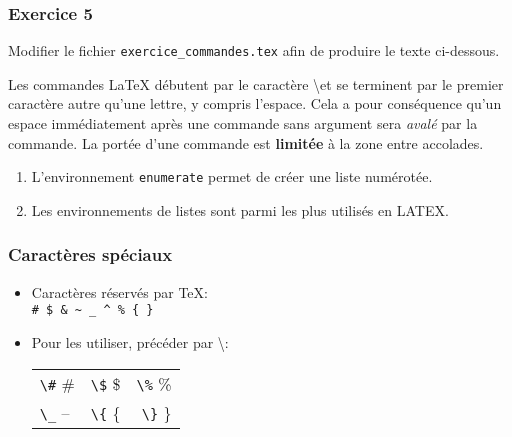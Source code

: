 
\begin{frame}

	\frametitle{Exercice 5}
	
	Modifier le fichier \texttt{exercice\_commandes.tex} afin de produire le
	texte ci-dessous.
	
	{\rmfamily Les commandes {\LaTeX} débutent par le caractère \textbackslash et se terminent par le
		premier caractère autre qu’une lettre, y compris l’espace. Cela a pour conséquence
		qu’un espace immédiatement après une commande sans argument	sera \emph{avalé} par la commande.
		La portée d’une commande est \textbf{limitée} à la zone entre accolades.
		
		\begin{enumerate}
			\item L’environnement \texttt{enumerate} permet de créer une liste numérotée.
			\item Les environnements de listes sont parmi les plus utilisés en LATEX.
		\end{enumerate}
	}
\end{frame}


\begin{frame}[fragile]

	\frametitle{Caractères spéciaux}
	
	\begin{itemize}
		\item Caractères réservés par \TeX  : \\
		\lstinline|# $ & ~ _ ^ % { }|
		
		\item Pour les utiliser, précéder par \textbackslash  :\\
		\begin{tabular}{lcr}
			\lstinline|\#|  \#	&	\lstinline|\$|  \$	&	\lstinline|\%|  \% \\
			\lstinline|\_|  --	&	\lstinline|\{|  \{	&	\lstinline|\}|  \}
		\end{tabular}
	\end{itemize}

\end{frame}